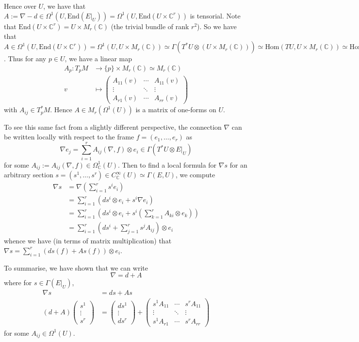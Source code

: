 \documentclass[a4paper]{article}
\theoremstyle{definition} \newtheorem*{definition}{Definition}
\theoremstyle{definition} \newtheorem*{definitions}{Definitions}
\theoremstyle{plain} \newtheorem{theorem}{Theorem}[section]
\theoremstyle{plain} \newtheorem{proposition}[theorem]{Proposition}
\theoremstyle{plain} \newtheorem{corollary}[theorem]{Corollary}
\theoremstyle{plain} \newtheorem{lemma}[theorem]{Lemma}
\theoremstyle{plain} \newtheorem{example}[theorem]{Example}
\newcommand{\complexnos}{\mathbb{C}}
\newcommand{\smoothCmaps}{C^\infty_\complexnos (U)}
\newcommand{\Hom}{\text{Hom}}
\newcommand{\End}{\text{End}}
\newcommand{\smooth}{C^\infty}
\begin{document}
Hence over $U$, we have that $A:=\nabla-d\in \Omega^1(U, \End(E|_U)) = \Omega^1(U, \End(U\times \complexnos^r))$ is tensorial. Note that $\End(U\times \complexnos^r)=U\times M_r(\complexnos)$ (the trivial bundle of rank $r^2$). So we have that $A\in \Omega^1(U, \End(U\times \complexnos^r)) = \Omega^1(U, U\times M_r(\complexnos)) \simeq \Gamma(T^*U\otimes (U\times M_r(\complexnos))) \simeq \Hom(TU, U\times M_r(\complexnos)) \simeq \Hom_{\smooth(M)}(\mathfrak{X}(U), M_r(\smoothCmaps))$. Thus for any $p\in U$, we have a linear map
\begin{align*}
A_p : T_pM & \to \{p\}\times M_r(\complexnos) \simeq M_r(\complexnos) \\
v & \mapsto \begin{pmatrix}
A_{11}(v) & \cdots & A_{11}(v)\\
\vdots & \ddots & \vdots \\
A_{r1}(v) & \cdots & A_{rr}(v)
\end{pmatrix}
\end{align*}
with $A_{ij}\in T_p^*M$. Hence $A\in M_r(\Omega^1(U))$ is a matrix of one-forms on $U$. 

To see this same fact from a slightly different perspective, the connection $\nabla$ can be written locally with respect to the frame $f=(e_1, \ldots, e_r)$ as 
$$\nabla e_j = \sum_{i=1}^r A_{ij}(\nabla, f)\otimes e_i \in \Gamma(T^*U\otimes E|_U)$$
for some $A_{ij}:=A_{ij}(\nabla, f) \in \Omega_\complexnos^1(U)$. Then to find a local formula for $\nabla s$ for an arbitrary section $s=(s^1, \ldots,  s^r)\in \smoothCmaps\simeq \Gamma(E, U)$, we compute
\begin{align*}
\nabla s & = \nabla (\sum_{i=1}^r s^i e_i) \\
& = \sum_{i=1}^r (d s^i \otimes e_i + s^i \nabla e_i) \\
& = \sum_{i=1}^r (d s^i \otimes e_i + s^i (\sum_{k=1}^r A_{ki}\otimes e_k )) \\
& = \sum_{i=1}^r (d s^i + \sum_{j=1}^r s^j A_{ij})\otimes e_i 
\end{align*}
whence we have (in terms of matrix multiplication) that 
$\nabla s = \sum_{i=1}^r (d s(f) + As(f))\otimes e_i$.

To summarise, we have shown that we can write 
$$\nabla = d + A$$ 
where for $s\in \Gamma(E|_U)$,
\begin{align*}
\nabla s & = ds + As \\ 
(d+A)\begin{pmatrix}
    s^1 \\
    \vdots \\
    s^r
\end{pmatrix}
& = \begin{pmatrix}ds^1 \\ \vdots \\ ds^r\end{pmatrix} + \begin{pmatrix}
s^1A_{11} & \cdots & s^rA_{11}\\
\vdots & \ddots & \vdots \\
s^1A_{r1} & \cdots & s^rA_{rr}
\end{pmatrix} 
\end{align*}
for some $A_{ij}\in \Omega^1(U)$. 
\end{document}
